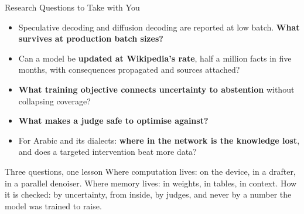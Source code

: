 \begin{frame}{Research Questions to Take with You}
    \begin{itemize}\itemsep0.45em
        \item Speculative decoding and diffusion decoding are reported at low batch. \textbf{What survives at production batch sizes?}
        \item Can a model be \textbf{updated at Wikipedia's rate}, half a million facts in five months, with consequences propagated and sources attached?
        \item \textbf{What training objective connects uncertainty to abstention} without collapsing coverage?
        \item \textbf{What makes a judge safe to optimise against?}
        \item For Arabic and its dialects: \textbf{where in the network is the knowledge lost}, and does a targeted intervention beat more data?
    \end{itemize}
    \vspace{0.3em}
    \begin{block}{Three questions, one lesson}
        Where computation lives: on the device, in a drafter, in a parallel denoiser. Where memory lives: in weights, in tables, in context. How it is checked: by uncertainty, from inside, by judges, and never by a number the model was trained to raise.
    \end{block}
\end{frame}
